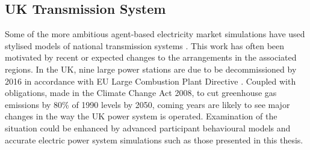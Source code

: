 \subsection{UK Transmission System}
Some of the more ambitious agent-based electricity market simulations have used
stylised models of national transmission systems
\cite{cincotti:09,weidlich:06}.  This work has often been motivated by recent
or expected changes to the arrangements in the associated regions.
In the UK, nine large power stations are due to be decommissioned by 2016 in
accordance with EU Large Combustion Plant Directive \cite{ngt07lcpd}.  Coupled
with obligations, made in the Climate Change Act 2008, to cut greenhouse gas
emissions by 80\% of 1990 levels by 2050, coming years are likely to see major
changes in the way the UK power system is operated.
Examination of the situation could be enhanced by advanced participant
behavioural models and accurate electric power system simulations such as those
presented in this thesis.

